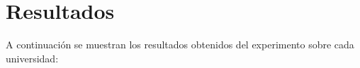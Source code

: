 \section{Resultados}

A continuación se muestran los resultados obtenidos del experimento sobre cada universidad:



\newpage



\newpage



\newpage



\newpage